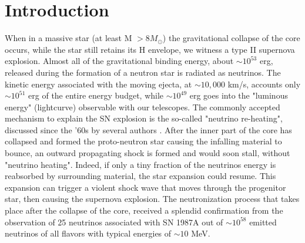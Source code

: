 \documentclass[twocolumn]{aastex631}
\begin{document}


\section{Introduction}
When in a massive star (at least M $> 8M_{\odot}$) the gravitational collapse of the core occurs, while the star still retains its H envelope, we witness a type II supernova explosion. Almost all of the gravitational binding energy, about $ \sim 10^{53}$ erg, released during the formation of a neutron star is radiated as neutrinos. The kinetic energy associated with the moving ejecta, at $\sim 10,000$ km/s, accounts only $\sim 10^{51}$ erg of the entire energy budget, while $\sim 10^{49}$ erg goes into the "luminous energy" (lightcurve) observable with our telescopes. The commonly accepted mechanism to explain the SN explosion is the so-called "neutrino re-heating", discussed since the '60s by several authors \citep{colgatewhite,colgatemkee,Colgate82,Bahcall1990,janka1996}. After the inner part of the core has collapsed and formed the proto-neutron star causing the infalling material to bounce, an outward propagating shock is formed and would soon stall, without "neutrino heating". Indeed, if only a tiny fraction of the neutrinos energy is reabsorbed by surrounding material, the star expansion could resume. This expansion can trigger a violent shock wave that moves through the progenitor star, then causing the supernova explosion. The neutronization process that takes place after the collapse of the core, received a splendid confirmation from the observation of 25 neutrinos associated with SN 1987A \citep{Hirata87,Bionta87,Alexeyev88}
out of $\sim 10^{58}$ emitted neutrinos of all flavors with typical energies of $\sim 10$ MeV.
\end{document}
